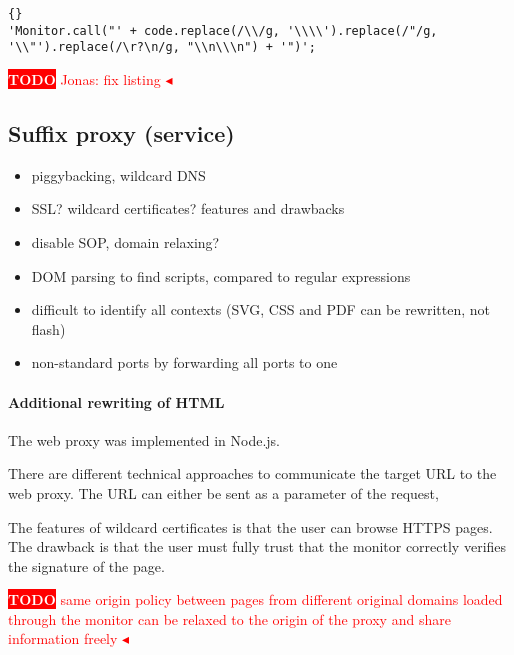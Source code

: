 \documentclass{llncs}
\newcommand{\todo}[1]{\colorbox{red}{\textcolor{white}{\sffamily\bfseries\scriptsize TODO}} \textcolor{red}{#1} \textcolor{red}{$\blacktriangleleft$}}
\begin{document}
\begin{lstlisting}{}
'Monitor.call("' + code.replace(/\\/g, '\\\\').replace(/"/g, '\\"').replace(/\r?\n/g, "\\n\\\n") + '")';
\end{lstlisting}
\todo{Jonas: fix listing}

\subsection{Suffix proxy (service)}

\begin{itemize}
\item piggybacking, wildcard DNS
\item SSL? wildcard certificates? features and drawbacks 
\item disable SOP, domain relaxing?
\item DOM parsing to find scripts, compared to regular expressions
\item difficult to identify all contexts (SVG, CSS and PDF can be rewritten, not flash)
\item non-standard ports by forwarding all ports to one
\end{itemize}


\paragraph{Additional rewriting of HTML}


The web proxy was implemented in Node.js. 

There are different technical approaches to communicate the target URL to the web 
proxy. The URL can either be sent as a parameter of the request, 

The features of wildcard certificates is that the user can browse HTTPS pages. The drawback is that the user must fully trust that the monitor correctly verifies the signature of the page.

\todo{same origin policy between pages from different original domains loaded through the monitor can be relaxed to the origin of the proxy and share information freely}
\end{document}
